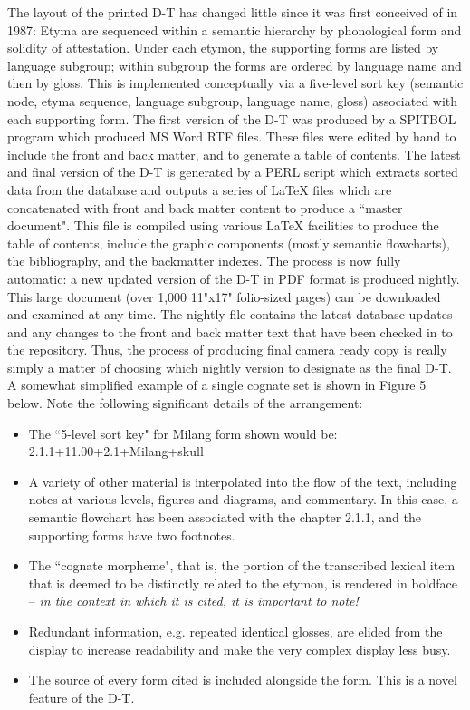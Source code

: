 The layout of the printed D-T has changed little since it was first conceived of in 1987: Etyma are sequenced within a semantic hierarchy by phonological form and solidity of attestation.  Under each etymon, the supporting forms are listed by language subgroup; within subgroup the forms are ordered by language name and then by gloss.  This is implemented conceptually via a five-level sort key (semantic node, etyma sequence, language subgroup, language name, gloss) associated with each supporting form.   The first version of the D-T was produced by a SPITBOL program which produced MS Word RTF files. These files were edited by hand to include the front and back matter, and to generate a table of contents. The latest and final version of the D-T is generated by a PERL script which extracts sorted data from the database and outputs a series of LaTeX files which are concatenated with front and back matter content to produce a ``master document".  This file is compiled using various LaTeX facilities to produce the table of contents, include the graphic components (mostly semantic flowcharts), the bibliography, and the backmatter indexes.  The process is now fully automatic: a new updated version of the D-T in PDF format is produced nightly. This large document (over 1,000 11"x17" folio-sized pages) can be downloaded and examined at any time.  The nightly file contains the latest database updates and any changes to the front and back matter text that have been checked in to the repository. Thus, the process of producing final camera ready copy is really simply a matter of choosing which nightly version to designate as the final D-T.
A somewhat simplified example of a single cognate set is shown in
Figure 5 below. Note the following significant details of the
arrangement:
\begin{itemize}
\item  The ``5-level sort key" for Milang form shown would be: 
2.1.1+11.00+2.1+Milang+skull
\item  A variety of other material is interpolated into the flow of the text, including notes at various levels, figures and diagrams, and commentary. In this case, a semantic flowchart has been associated with the chapter 2.1.1, and the supporting forms have two footnotes.
\item  The ``cognate morpheme", that is, the portion of the transcribed
  lexical item that is deemed to be distinctly related to the etymon,
  is rendered in boldface -- {\it in the context in which it is cited,
    it is important to note!}
\item  Redundant information, e.g. repeated identical glosses, are elided from the display to increase readability and make the very complex display less busy.
\item  The source of every form cited is included alongside the
form. This is a novel feature of the D-T.
\end{itemize}
